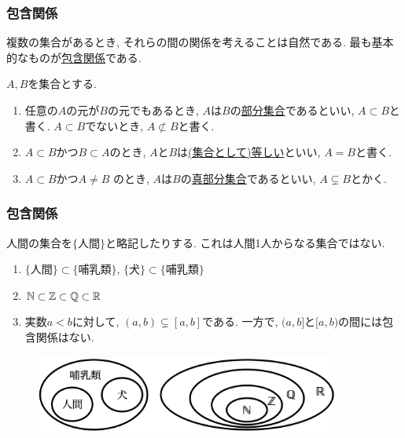 \begin{frame}
\frametitle{包含関係}   


複数の集合があるとき, それらの間の関係を考えることは自然である.  
最も基本的なものが\underline{包含関係}である.

\begin{Def}[部分集合]
$A, B$を集合とする.
\begin{enumerate}
\item 任意の$A$の元が$B$の元でもあるとき, $A$は$B$の\underline{部分集合}であるといい, $A \subset B$と書く.  
$A \subset B$でないとき, $A \not\subset B$と書く.
\item $A \subset B$かつ$B \subset A$のとき, $A$と$B$は\underline{(集合として)等しい}といい, $A=B$と書く. 
\item $A \subset B$かつ$A \ne B$ のとき, $A$は$B$の\underline{真部分集合}であるといい, $A \subsetneq B$とかく.
\end{enumerate} 
\end{Def}


\end{frame}




\begin{frame}
\frametitle{包含関係}   

人間の集合を$\{\text{人間}\}$と略記したりする. 
これは人間1人からなる集合ではない. 

\begin{Ex}
\begin{enumerate}
\item $\{\text{人間}\} \subset \{\text{哺乳類}\}$, $\{\text{犬}\} \subset \{\text{哺乳類}\}$
\item $\mathbb{N} \subset \mathbb{Z} \subset \mathbb{Q} \subset  \mathbb{R}$
\item 実数$a<b$に対して, $(a,b) \subsetneq [a,b]$である. 
一方で, $(a,b]$と$[a,b)$の間には包含関係はない. 
\end{enumerate} 
\end{Ex}


 \begin{figure}[htbp]
 \begin{center} 
  \includegraphics[width=100mm]{calculus1/subsets.png}
 \end{center}
\end{figure}

\end{frame}



